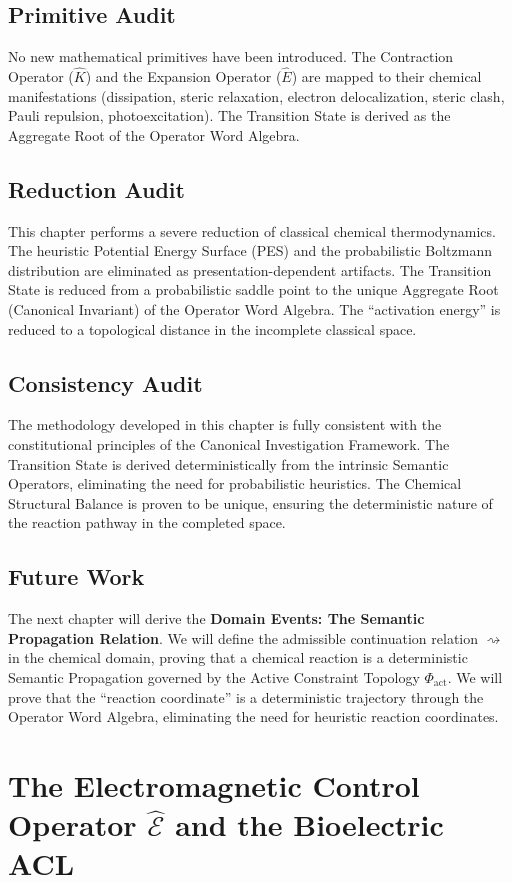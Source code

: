 \documentclass[11pt,openany]{extbook}
\newenvironment{primitiveaudit}{\section*{Primitive Audit}}{}
\newenvironment{reductionaudit}{\section*{Reduction Audit}}{}
\newenvironment{consistencyaudit}{\section*{Consistency Audit}}{}
\newenvironment{futurework}{\section*{Future Work}}{}
\theoremstyle{plain}
\theoremstyle{definition}
\begin{document}
\begin{primitiveaudit}
No new mathematical primitives have been introduced. The Contraction Operator ($\hat{K}$) and the Expansion Operator ($\hat{E}$) are mapped to their chemical manifestations (dissipation, steric relaxation, electron delocalization, steric clash, Pauli repulsion, photoexcitation). The Transition State is derived as the Aggregate Root of the Operator Word Algebra.
\end{primitiveaudit}

\begin{reductionaudit}
This chapter performs a severe reduction of classical chemical thermodynamics. The heuristic Potential Energy Surface (PES) and the probabilistic Boltzmann distribution are eliminated as presentation-dependent artifacts. The Transition State is reduced from a probabilistic saddle point to the unique Aggregate Root (Canonical Invariant) of the Operator Word Algebra. The ``activation energy'' is reduced to a topological distance in the incomplete classical space.
\end{reductionaudit}

\begin{consistencyaudit}
The methodology developed in this chapter is fully consistent with the constitutional principles of the Canonical Investigation Framework. The Transition State is derived deterministically from the intrinsic Semantic Operators, eliminating the need for probabilistic heuristics. The Chemical Structural Balance is proven to be unique, ensuring the deterministic nature of the reaction pathway in the completed space.
\end{consistencyaudit}

\begin{futurework}
The next chapter will derive the \textbf{Domain Events: The Semantic Propagation Relation}. We will define the admissible continuation relation $\rightsquigarrow$ in the chemical domain, proving that a chemical reaction is a deterministic Semantic Propagation governed by the Active Constraint Topology $\Phi_{\text{act}}$. We will prove that the ``reaction coordinate'' is a deterministic trajectory through the Operator Word Algebra, eliminating the need for heuristic reaction coordinates.
\end{futurework}

\chapter{The Electromagnetic Control Operator $\hat{\mathcal{E}}$ and the Bioelectric ACL}
\end{document}
